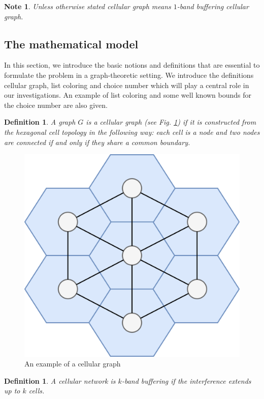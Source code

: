 \documentclass[a4paper, 12pt]{article}
\newtheorem{defin}[lem]{Definition}
\newtheorem{note}[lem]{Note}
\begin{document}
\begin{note} Unless otherwise stated cellular graph means $1$-band buffering cellular graph.
\end{note}

\subsection{The mathematical model}\label{sec:math-model}
In this section, we introduce the basic notions and definitions that are essential to formulate the problem in a graph-theoretic setting. We introduce the definitions cellular graph, list coloring and choice number which will play a central role in our investigations. An example of list coloring and some well known bounds for the choice number are also given.
\begin{defin} A graph $G$ is a  \textit{cellular graph} (see Fig. \ref{fig:cellular-graph}) if it is constructed from the hexagonal cell topology in the following way: each cell is a node and two nodes are connected if and only if they share a common boundary.
\end{defin}
\begin{figure}[!h]
\centering
\includegraphics[scale=0.15]{figures/cellular-graph.png}
\caption{An example of a cellular graph}\label{fig:cellular-graph}
\end{figure}
\begin{defin} A cellular network is $k$\textit{-band buffering} if the interference extends up to $k$ cells.
\end{defin}
\end{document}
